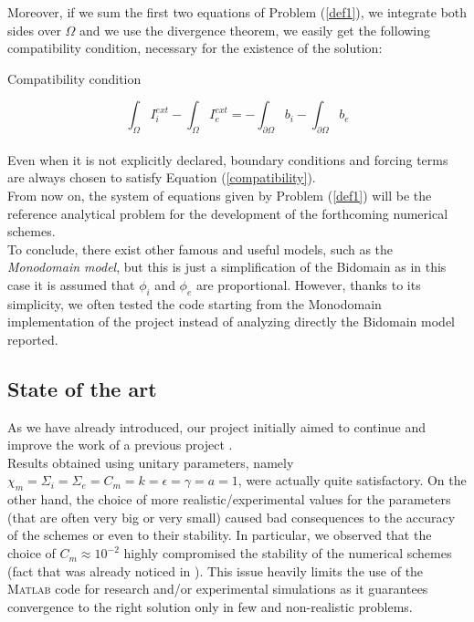 \documentclass[a4paper,11pt]{article}
\begin{document}
    \vspace{4mm}
    \noindent Moreover, if we sum the first two equations of Problem (\ref{def1}), we integrate both sides over $\Omega $ and we use the divergence theorem, we easily get the following compatibility condition, necessary for the existence of the solution: \\
    \begin{mycapequ}[!ht]
    	\caption{Compatibility condition}
    \end{mycapequ}
    \begin{equation} \label{compatibility}
    \int_{\Omega} I_i^{ext} - \int_{\Omega} I_e^{ext} = -\int_{\partial \Omega} b_i - \int_{\partial \Omega} b_e
    \end{equation} \vspace{3mm} \\
    Even when it is not explicitly declared, boundary conditions and forcing terms are always chosen to satisfy Equation (\ref{compatibility}). \\
    

    \noindent From now on, the system of equations given by Problem (\ref{def1}) will be the reference analytical problem for the development of the forthcoming numerical schemes.\\
    To conclude, there exist other famous and useful models, such as the \emph{Monodomain model}, but this is just a simplification of the Bidomain as in this case it is assumed that $\phi_i$ and $\phi_e$ are proportional. However, thanks to its simplicity, we often tested the code starting from the Monodomain implementation of the project \cite{andreotti} instead of analyzing directly the Bidomain model reported.

    \subsection{State of the art}\label{past}
    As we have already introduced, our project initially aimed to continue and improve the work of a previous project \cite{marta}. \\
    Results obtained using unitary parameters, namely $\chi_m =\Sigma_i= \Sigma_e= C_m= k = \epsilon= \gamma= a=1$, were actually quite satisfactory. On the other hand, the choice of more realistic/experimental values for the parameters (that are often very big or very small) caused bad consequences to the accuracy of the schemes or even to their stability. In particular, we observed that the choice of $C_m \approx 10^{-2}$ highly compromised the stability of the numerical schemes (fact that was already noticed in \cite{andreotti}).
    This issue heavily limits the use of the \textsc{Matlab} code for research and/or experimental simulations as it guarantees convergence to the right solution only in few and non-realistic problems.  \\
\end{document}
